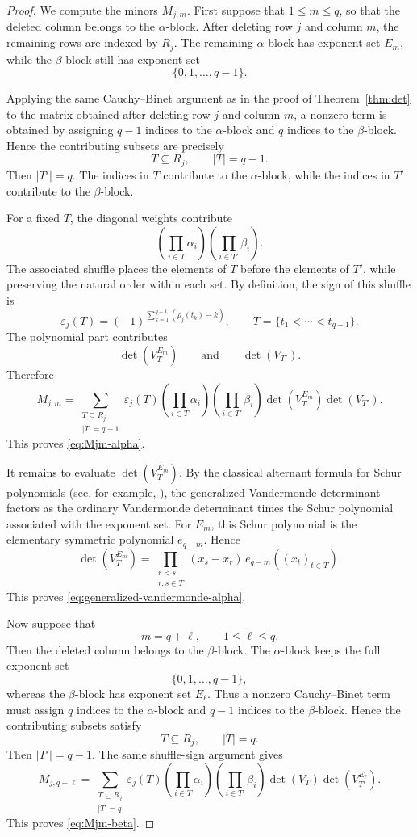 \documentclass[11pt,a4paper]{article}
\theoremstyle{definition}
\begin{document}
\begin{proof}
We compute the minors \(M_{j,m}\). First suppose that
\(1\leq m\leq q\), so that the deleted column belongs to the
\(\alpha\)-block.  After deleting row \(j\) and column \(m\), the
remaining rows are indexed by \(R_j\). The remaining \(\alpha\)-block has exponent set \(E_m\), while the
\(\beta\)-block still has exponent set
\[
\{0,1,\dots,q-1\}.
\]

Applying the same Cauchy--Binet argument as in the proof of
Theorem~\ref{thm:det} to the matrix obtained after deleting row \(j\)
and column \(m\), a nonzero term is obtained by assigning \(q-1\)
indices to the \(\alpha\)-block and \(q\) indices to the
\(\beta\)-block. Hence the contributing subsets are precisely
\[
T\subseteq R_j,
\qquad
|T|=q-1.
\]
Then \(|T'|=q\). The indices in \(T\) contribute to the
\(\alpha\)-block, while the indices in \(T'\) contribute to the
\(\beta\)-block.

For a fixed \(T\), the diagonal weights contribute
\[
\left(\prod_{i\in T}\alpha_i\right)
\left(\prod_{i\in T'}\beta_i\right).
\]
The associated shuffle places the elements of \(T\) before the
elements of \(T'\), while preserving the natural order within each
set. By definition, the sign of this shuffle is
\[
\varepsilon_j(T)
=
(-1)^{\sum_{k=1}^{q-1}(\rho_j(t_k)-k)},
\qquad
T=\{t_1<\cdots<t_{q-1}\}.
\]
The polynomial part contributes
\[
\det\!\left(V_T^{E_m}\right)
\qquad\text{and}\qquad
\det(V_{T'}).
\]
Therefore
\[
M_{j,m}
=
\sum_{\substack{T\subseteq R_j\\ |T|=q-1}}
\varepsilon_j(T)
\left(\prod_{i\in T}\alpha_i\right)
\left(\prod_{i\in T'}\beta_i\right)
\det\!\left(V_T^{E_m}\right)
\det(V_{T'}).
\]
This proves \eqref{eq:Mjm-alpha}.

It remains to evaluate \(\det(V_T^{E_m})\). By the classical
alternant formula for Schur polynomials (see, for example,
\cite{Macdonald}), the generalized Vandermonde determinant factors as
the ordinary Vandermonde determinant times the Schur polynomial
associated with the exponent set. For \(E_m\), this Schur polynomial is
the elementary symmetric polynomial \(e_{q-m}\). Hence
\[
\det\!\left(V_T^{E_m}\right)
=
\prod_{\substack{r<s\\ r,s\in T}}(x_s-x_r)\,
e_{q-m}\!\left((x_t)_{t\in T}\right).
\]
This proves \eqref{eq:generalized-vandermonde-alpha}.

Now suppose that
\[
m=q+\ell,
\qquad
1\leq\ell\leq q.
\]
Then the deleted column belongs to the \(\beta\)-block. The
\(\alpha\)-block keeps the full exponent set
\[
\{0,1,\dots,q-1\},
\]
whereas the \(\beta\)-block has exponent set $E_\ell$.
Thus a nonzero Cauchy--Binet term must assign \(q\) indices to the
\(\alpha\)-block and \(q-1\) indices to the \(\beta\)-block. Hence the
contributing subsets satisfy
\[
T\subseteq R_j,
\qquad
|T|=q.
\]
Then \(|T'|=q-1\). The same shuffle-sign argument gives
\[
M_{j,q+\ell}
=
\sum_{\substack{T\subseteq R_j\\ |T|=q}}
\varepsilon_j(T)
\left(\prod_{i\in T}\alpha_i\right)
\left(\prod_{i\in T'}\beta_i\right)
\det(V_T)
\det\!\left(V_{T'}^{E_\ell}\right).
\]
This proves \eqref{eq:Mjm-beta}.


\end{proof}
\end{document}
